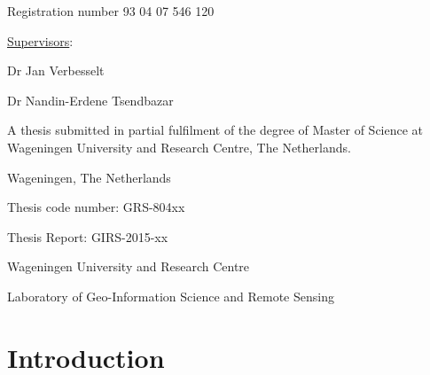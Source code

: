 \documentclass[a4paper,12pt]{scrbook}
\begin{document}
\begin{titlingpage}
  \newpage %
  \thispagestyle{empty}
  
  \centering

  {\bfseries \Large \thetitle} \vspace{2.7cm}
  
  {\Large \theauthor} \vspace{1.1cm}
  
  {Registration number 93 04 07 546 120} \vspace{3.5cm}
  
  {\large \underline{Supervisors}:} \vspace{1.1cm}
  
  {Dr Jan Verbesselt}
  
  {Dr Nandin-Erdene Tsendbazar} \vspace{3.0cm}
  
  {A thesis submitted in partial fulfilment of the degree of Master of Science at Wageningen University and Research Centre, The Netherlands.} \vspace{3.7cm}
  
  \begin{flushright}
    {\thedate}
  
    {Wageningen, The Netherlands}
  \end{flushright} \vspace{0.5cm}

  \begin{flushleft}
    Thesis code number: GRS-804xx
  
    Thesis Report: GIRS-2015-xx
  
    Wageningen University and Research Centre
  
    Laboratory of Geo-Information Science and Remote Sensing 
  \end{flushleft}
\end{titlingpage}

\setcounter{page}{3}

\tableofcontents

\chapter{Introduction}
\end{document}
